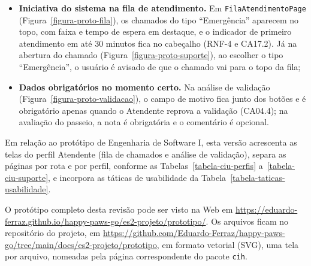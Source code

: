 \begin{sloppypar}
\begin{itemize}
	\item \textbf{Iniciativa do sistema na fila de atendimento.} Em \texttt{FilaAtendimentoPage} (Figura~\ref{figura-proto-fila}), os chamados do tipo ``Emergência'' aparecem no topo, com faixa e tempo de espera em destaque, e o indicador de primeiro atendimento em até 30 minutos fica no cabeçalho (RNF-4 e CA17.2). Já na abertura do chamado (Figura~\ref{figura-proto-suporte}), ao escolher o tipo ``Emergência'', o usuário é avisado de que o chamado vai para o topo da fila;

	\item \textbf{Dados obrigatórios no momento certo.} Na análise de validação (Figura~\ref{figura-proto-validacao}), o campo de motivo fica junto dos botões e é obrigatório apenas quando o Atendente reprova a validação (CA04.4); na avaliação do passeio, a nota é obrigatória e o comentário é opcional.
\end{itemize}
\end{sloppypar}

Em relação ao protótipo de Engenharia de Software I, esta versão acrescenta as telas do perfil Atendente (fila de chamados e análise de validação), separa as páginas por rota e por perfil, conforme as Tabelas~\ref{tabela-ciu-perfis} a~\ref{tabela-ciu-suporte}, e incorpora as táticas de usabilidade da Tabela~\ref{tabela-taticas-usabilidade}.

O protótipo completo desta revisão pode ser visto na Web em \url{https://eduardo-ferraz.github.io/happy-paws-go/es2-projeto/prototipo/}. Os arquivos ficam no repositório do projeto, em \url{https://github.com/Eduardo-Ferraz/happy-paws-go/tree/main/docs/es2-projeto/prototipo}, em formato vetorial (SVG), uma tela por arquivo, nomeadas pela página correspondente do pacote \texttt{cih}.

